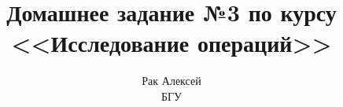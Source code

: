 \documentclass{article}
\title{Домашнее задание №3 по курсу \\ <<Исследование операций>>}
\author{Рак Алексей \\ БГУ}
\date{}
\begin{document}
	
\newcommand{\PI}{3.141592654}
\newcommand{\Sum}{\sum\limits}
\newcommand{\Int}{\int\limits}
\newcommand{\Intf}{\int\limits_{-\infty}^{+\infty}}
\newcommand{\Prod}{\prod\limits}
\newcommand{\Max}{\max\limits}
\newcommand{\Min}{\min\limits}
\newcommand{\Var}{\mathbb{V}}
\newcommand{\Exp}{\mathbb{E}}
\newcommand{\ARE}{\mathbb{ARE}}
\newcommand{\argmax}{\arg\max}
\newcommand{\Cov}{\text{Cov}}
\newcommand{\makebold}[1]{\boldsymbol{#1}}
\newcommand{\mean}[1]{\overline{#1}}

\newcommand{\esttheta}{\hat{\theta}}
\newcommand{\estlambda}{\hat{\lambda}}
\newcommand{\estmu}{\hat{\mu}}
\newcommand{\estsigma}{\hat{\sigma}}
\newcommand{\estdelta}{\hat{\delta}}
\newcommand{\estT}{\hat{T}}
\newcommand{\estF}{\hat{F}}
\newcommand{\estC}{\hat{C}}
\newcommand{\estVar}{\hat{\Var}}
\newcommand{\estExp}{\hat{\Exp}}
\newcommand{\estSe}{\hat{\se}}

\newcommand{\tilpsi}{\hat{\psi}}

\newcommand{\mlexi}{\xi_{MLE}}
\newcommand{\mletheta}{\theta_{MLE}}
\newcommand{\mlelambda}{\lambda_{MLE}}
\newcommand{\mlesigma}{\sigma_{MLE}}
\newcommand{\mlepsi}{\psi_{MLE}}

\newcommand{\mmxi}{\xi_{MM}}
\newcommand{\mmtheta}{\theta_{MM}}
\newcommand{\mmlambda}{\lambda_{MM}}
\newcommand{\mmsigma}{\sigma_{MM}}
\newcommand{\mmpsi}{\psi_{MM}}


\newcommand{\Ecdf}[1]{\estF_n(#1)}
\newcommand{\OPT}{\mathrm{OPT}}
\newcommand{\opt}{\mathrm{opt}}
\newcommand{\boot}{\mathrm{boot}\xspace}
\newcommand{\bias}{\mathrm{bias}\xspace}
\newcommand{\se}{\mathrm{se}\xspace}
\newcommand{\MSE}{\mathrm{MSE}\xspace}
\newcommand{\qm}{\mathrm{qm}\xspace}
\newcommand{\as}{\mathrm{as}\xspace}

\newcommand{\lp}{\left(}
\newcommand{\rp}{\right)}
\newcommand{\lf}{\left\{}
\newcommand{\rf}{\right\}}
\newcommand{\ls}{\left[}
\newcommand{\rs}{\right]}
\newcommand{\lv}{\left|}
\newcommand{\rv}{\right|}


\newcommand{\RR}{\mathbb{R}}
\newcommand{\NN}{\mathbb{N}}
\newcommand{\ZZ}{\mathbb{Z}}

\newcommand{\Poisson}{\mathrm{Poisson}\xspace}
\newcommand{\Uniform}{\mathrm{Uniform}\xspace}
\newcommand{\Binomial}{\mathrm{Binomial}\xspace}
\newcommand{\Gammap}{\mathrm{Gamma}\xspace}
\newcommand{\Normal}{\mathcal{N}\xspace}
\newcommand{\LogN}{\mathrm{LogN}\xspace}
\newcommand{\Exponential}{\mathrm{Exp}\xspace}
\newcommand{\Erlang}{\mathrm{Erlang}\xspace}
\newcommand{\Cauchy}{C\xspace}
\end{document}
